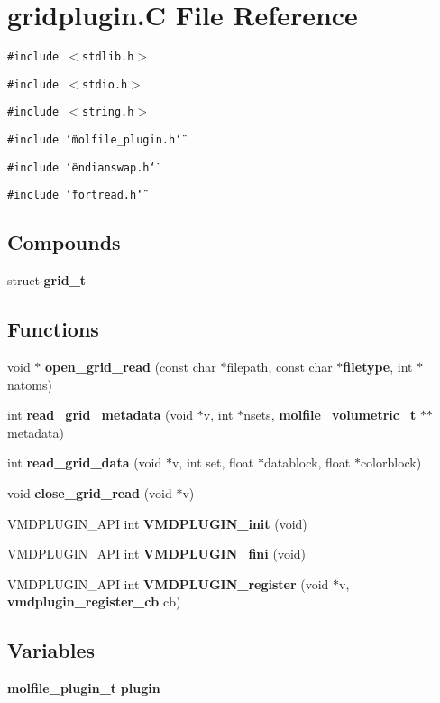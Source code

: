 \section{gridplugin.C File Reference}
\label{gridplugin_8C}
{\tt \#include $<$stdlib.h$>$}\par
{\tt \#include $<$stdio.h$>$}\par
{\tt \#include $<$string.h$>$}\par
{\tt \#include \char`\"{}molfile\_\-plugin.h\char`\"{}}\par
{\tt \#include \char`\"{}endianswap.h\char`\"{}}\par
{\tt \#include \char`\"{}fortread.h\char`\"{}}\par
\subsection*{Compounds}
\begin{CompactItemize}
\item 
struct {\bf grid\_\-t}
\end{CompactItemize}
\subsection*{Functions}
\begin{CompactItemize}
\item 
void $\ast$ {\bf open\_\-grid\_\-read} (const char $\ast$filepath, const char $\ast${\bf filetype}, int $\ast$natoms)
\item 
int {\bf read\_\-grid\_\-metadata} (void $\ast$v, int $\ast$nsets, {\bf molfile\_\-volumetric\_\-t} $\ast$$\ast$metadata)
\item 
int {\bf read\_\-grid\_\-data} (void $\ast$v, int set, float $\ast$datablock, float $\ast$colorblock)
\item 
void {\bf close\_\-grid\_\-read} (void $\ast$v)
\item 
VMDPLUGIN\_\-API int {\bf VMDPLUGIN\_\-init} (void)
\item 
VMDPLUGIN\_\-API int {\bf VMDPLUGIN\_\-fini} (void)
\item 
VMDPLUGIN\_\-API int {\bf VMDPLUGIN\_\-register} (void $\ast$v, {\bf vmdplugin\_\-register\_\-cb} cb)
\end{CompactItemize}
\subsection*{Variables}
\begin{CompactItemize}
\item 
{\bf molfile\_\-plugin\_\-t} {\bf plugin}
\end{CompactItemize}


